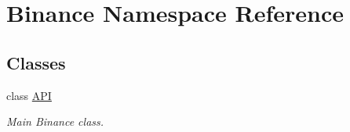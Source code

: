 \hypertarget{namespaceBinance}{\section{Binance Namespace Reference}
\label{namespaceBinance}
}
\subsection*{Classes}
\begin{DoxyCompactItemize}
\item 
class \hyperlink{classBinance_1_1API}{A\-P\-I}
\begin{DoxyCompactList}\small\item\em Main Binance class. \end{DoxyCompactList}\end{DoxyCompactItemize}
